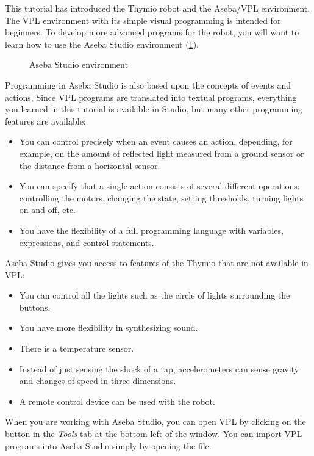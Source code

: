
\label{ch.next}

This tutorial has introduced the Thymio robot and the Aseba/VPL
environment. The VPL environment with its simple visual programming is
intended for beginners. To develop more advanced programs for the robot,
you will want to learn how to use the Aseba Studio environment (\cref{fig.studio}).

\begin{figure}[hbt]
\begin{center}
\caption{Aseba Studio environment}\label{fig.studio}
\end{center}
\end{figure}

Programming in Aseba Studio is also based upon the concepts of events
and actions.
Since VPL programs are translated into textual programs,
everything you learned in this tutorial is available in Studio,
but many other programming features are available:
\begin{itemize}
\item You can control precisely when an event causes an action, depending, for
example, on the amount of reflected light measured from a ground sensor or
the distance from a horizontal sensor.
\item You can specify that a single action consists of several different
operations: controlling the motors, changing the state, setting
thresholds, turning lights on and off, etc.
\item You have the flexibility of a full programming language with
variables, expressions, and control statements.
\end{itemize}

Aseba Studio gives you access to features of the Thymio that are not
available in VPL:

\begin{itemize}
\item You can control all the lights such as the circle of lights
surrounding the buttons.
\item You have more flexibility in synthesizing sound.
\item There is a temperature sensor.
\item Instead of just sensing the shock of a tap, accelerometers
can sense gravity and changes of speed in three dimensions.
\item A remote control device can be used with the robot.
\end{itemize}
When you are working with Aseba Studio, you can open VPL by clicking on
the button  in the \emph{Tools} tab at the bottom left of the window.
You can import VPL programs into Aseba Studio simply by opening the file.

